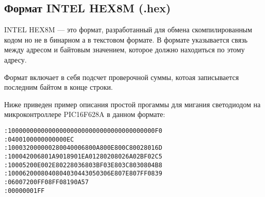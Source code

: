 \subsection{Формат INTEL HEX8M (.hex)}
INTEL HEX8M — это формат, разработанный для обмена скомпилированным кодом но не в бинарном а в текстовом формате.
В формате указывается связь между адресом и байтовым значением, которое должно находиться по этому адресу.

Формат включает в себя подсчет проверочной суммы, котоая записывается последним байтом в конце строки.

Ниже приведен пример описания простой прогаммы для мигания светодиодом на микроконтроллере PIC16F628A в данном формате:

\begin{small}
\begin{verbatim}
:1000000000000000000000000000000000000000F0
:0400100000000000EC
:100032000000280040006800A800E800C80028016D
:100042006801A9018901EA01280208026A02BF02C5
:10005200E002E80228036803BF03E803C8030804B8
:1000620008040804030443050306E807E807FF0839
:06007200FF08FF08190A57
:00000001FF
\end{verbatim}
\end{small}
